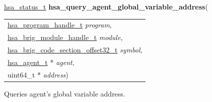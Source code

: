 \documentclass[final]{book}
\newcommand{\hsaarg}[1]{\textit{#1}}
\begin{document}
\begin{appendices}
\noindent\begin{tcolorbox}[breakable,nobeforeafter,colframe=white,colback=lightgray,left=0mm]
\hyperlink{group--status-1gad755322e7ff95456520e8abdbe90d225}{hsa_status_t} \hypertarget{group--HsailLinkerServiceLayer-1ga3f668bca131d0c0225cde24e17d3b030}{\textbf{hsa_query_agent_global_variable_address}}(
\vspace{-3.5mm}\begin{longtable}{@{}p{\textwidth}}
\hspace{1.7em}\hyperlink{group--HsailLinkerServiceLayer-1ga7b28ca39da981be49aac99608eb386cb}{hsa_program_handle_t} \hsaarg{program},\\
\hspace{1.7em}\hyperlink{group--FinalizerCoreApi-1gafaea8b9ab368c499b58375f02f4b178b}{hsa_brig_module_handle_t} \hsaarg{module},\\
\hspace{1.7em}\hyperlink{group--FinalizerCoreApi-1ga975ce5cee53438ed8dc078f3e1dfbc04}{hsa_brig_code_section_offset32_t} \hsaarg{symbol},\\
\hspace{1.7em}\hyperlink{group--topology-1gab8db3fb886332a24acac08ec361e1d86}{hsa_agent_t} * \hsaarg{agent},\\
\hspace{1.7em}uint64_t * \hsaarg{address})\end{longtable}

\end{tcolorbox}
Queries agent's global variable address.


\end{appendices}
\end{document}
